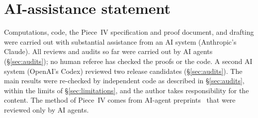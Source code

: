 \documentclass[11pt]{amsart}
\theoremstyle{definition}
\theoremstyle{remark}
\numberwithin{equation}{section}
\begin{document}
\section*{AI-assistance statement}
Computations, code, the Piece~IV specification and proof document, and drafting were carried out with substantial assistance from an AI system (Anthropic's Claude). All reviews and audits so far were carried out by AI agents (\S\ref{sec:audits}); no human referee has checked the proofs or the code. A second AI system (OpenAI's Codex) reviewed two release candidates (\S\ref{sec:audits}). The main results were re-checked by independent code as described in \S\ref{sec:audits}, within the limits of \S\ref{sec:limitations}, and the author takes responsibility for the content. The method of Piece~IV comes from AI-agent preprints~\cite{rh45,rh60} that were reviewed only by AI agents.



\end{document}
